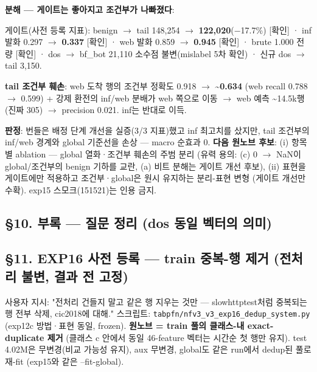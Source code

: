 \textbf{분해 — 게이트는 좋아지고 조건부가 나빠졌다}:

\par\noindent \textbullet\enspace 게이트(사전 등록 지표): benign \ensuremath{\rightarrow} tail 148,254 \ensuremath{\rightarrow} \textbf{122,020}(−17.7\%) [확인] · inf 발화 0.297 \ensuremath{\rightarrow} \textbf{0.337} [확인] · web 발화 0.859 \ensuremath{\rightarrow} \textbf{0.945} [확인] · brute 1.000 전량 [확인] · dos \ensuremath{\rightarrow} bf\_\allowbreak{}bot 21,110 소수점 불변(mislabel 5차 확인) · 신규 dos \ensuremath{\rightarrow} tail 3,150.


\par\noindent \textbullet\enspace \textbf{tail 조건부 훼손}: web 도착 행의 조건부 정확도 0.918 \ensuremath{\rightarrow} \textbf{\textasciitilde{}0.634} (web recall 0.788 \ensuremath{\rightarrow} 0.599) +\allowbreak{} 강제 환전의 inf/\allowbreak{}web 분배가 web 쪽으로 이동  \ensuremath{\rightarrow}  web 예측 \textasciitilde{}14.5k행 (진짜 305)  \ensuremath{\rightarrow}  precision 0.021. inf는 반대로 이득.


\textbf{판정}: 번들은 배정 단계 개선을 실증(3/\allowbreak{}3 지표)했고 inf 최고치를 샀지만, tail 조건부의 inf/\allowbreak{}web 경계와 global 기준선을 손상 — macro 순효과 0. \textbf{다음 원노브 후보}: (i) 항목별 ablation — global 열화·조건부 훼손의 주범 분리 (유력 용의: (c) 0 \ensuremath{\rightarrow} NaN이 global/\allowbreak{}조건부의 benign 기하를 교란, (a) 비트 분해는 게이트 개선 후보), (ii) 표현을 게이트에만 적용하고 조건부·global은 원시 유지하는 분리-표현 변형 (게이트 개선만 수확). exp15 스모크(151521)는 인용 금지.

\subsection{§10. 부록 — 질문 정리 (dos 동일 벡터의 의미)}
\subsection{§11. EXP16 사전 등록 — train 중복-행 제거 (전처리 불변, 결과 전 고정)}
사용자 지시: "전처리 건들지 말고 같은 행 지우는 것만 — slowhttptest처럼 중복되는 행 전부 삭제, cic2018에 대해." 스크립트: \texttt{tabpfn/\allowbreak{}\allowbreak{}n\allowbreak{}fv3\_\allowbreak{}\allowbreak{}v3\_\allowbreak{}\allowbreak{}e\allowbreak{}xp16\_\allowbreak{}\allowbreak{}ded\allowbreak{}up\_\allowbreak{}\allowbreak{}syste\allowbreak{}m.\allowbreak{}py} (exp12c 방법·표현 동일, frozen). \textbf{원노브 =\allowbreak{} train 풀의 클래스-내 exact-duplicate 제거} (클래스 c 안에서 동일 46-feature 벡터는 시간순 첫 행만 유지). test 4.02M은 무변경(비교 가능성 유지), aux 무변경, global도 같은 run에서 dedup된 풀로 재-fit (exp15와 같은 --fit-global).

